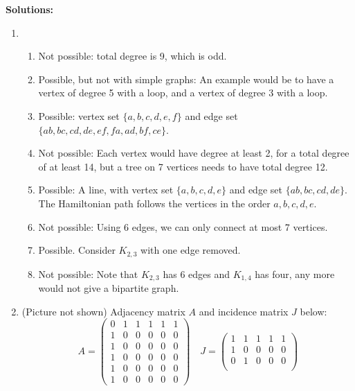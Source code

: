 \documentclass[a4paper,12pt]{article}
\begin{document}
\newpage

{\bf Solutions:}

\begin{enumerate}
\item
    \begin{enumerate}
    \item Not possible: total degree is 9, which is odd.
    \item Possible, but not with simple graphs: An example would be to have
    a vertex of degree 5 with a loop, and a vertex of degree 3 with a loop.
    \item Possible: vertex set $\{a, b, c, d, e, f\}$ and edge set
    $\{ab, bc, cd, de, ef, fa, ad, bf, ce\}$.
    \item Not possible: Each vertex would have degree at least 2, for a total
    degree of at least 14, but a tree on 7 vertices needs to have total degree
    12.
    \item Possible: A line, with vertex set $\{a,b,c,d,e\}$ and edge set
    $\{ab, bc, cd, de\}$. The Hamiltonian path follows the vertices in the order
    $a, b, c, d, e$.
    \item Not possible: Using 6 edges, we can only connect at most 7 vertices.
    \item Possible. Consider $K_{2,3}$ with one edge removed.
    \item Not possible: Note that $K_{2,3}$ has 6 edges and $K_{1,4}$ has four,
    any more would not give a bipartite graph.
    \end{enumerate}
\item
    (Picture not shown)
    Adjacency matrix $A$ and incidence matrix $J$ below:
    \[
    A = \begin{pmatrix}
        0 & 1 & 1 & 1 & 1 & 1 \\
        1 & 0 & 0 & 0 & 0 & 0 \\
        1 & 0 & 0 & 0 & 0 & 0 \\
        1 & 0 & 0 & 0 & 0 & 0 \\
        1 & 0 & 0 & 0 & 0 & 0 \\
        1 & 0 & 0 & 0 & 0 & 0
    \end{pmatrix}
    \quad
    J = \begin{pmatrix}
        1 & 1 & 1 & 1 & 1 \\
        1 & 0 & 0 & 0 & 0 \\
        0 & 1 & 0 & 0 & 0 \\

\end{pmatrix}\]
\end{enumerate}
\end{document}
